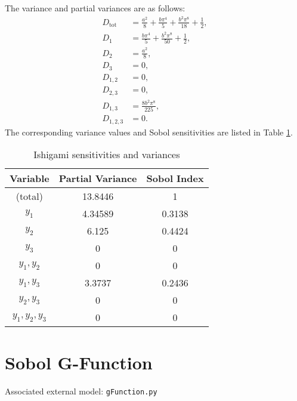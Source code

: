 The variance and partial variances are as follows:
\begin{align}
  D_\text{tot} &= \frac{a^2}{8} + \frac{b\pi^4}{5} + \frac{b^2\pi^8}{18} + \frac{1}{2}, \\
  D_1 &= \frac{b\pi^4}{5} + \frac{b^2\pi^8}{50} + \frac{1}{2} ,\\
  D_2 &= \frac{a^2}{8}, \\
  D_3 &= 0, \\
  D_{1,2} &= 0, \\
  D_{2,3} &= 0, \\
  D_{1,3} &= \frac{8b^2\pi^8}{225}, \\
  D_{1,2,3} &= 0.
\end{align}
The corresponding variance values and Sobol sensitivities are listed in Table \ref{tab:ishigami sens}.
\begin{table}[h]
  \centering
  \begin{tabular}{c|c|c}
    Variable & Partial Variance & Sobol Index \\ \hline
    (total) & 13.8446 & 1 \\
    $y_1$         & 4.34589 & 0.3138 \\
    $y_2$         & 6.125   & 0.4424 \\
    $y_3$         & 0       & 0      \\
    $y_1,y_2$     & 0       & 0      \\
    $y_1,y_3$     & 3.3737  & 0.2436 \\
    $y_2,y_3$     & 0       & 0      \\
    $y_1,y_2,y_3$ & 0       & 0      \\
  \end{tabular}
  \caption{Ishigami sensitivities and variances}
  \label{tab:ishigami sens}
\end{table}

%
%
%
%
%
%
\section{Sobol G-Function}
Associated external model: \texttt{gFunction.py}

